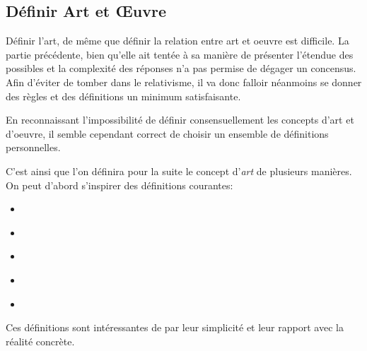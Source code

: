 \documentclass[12pt]{article} %
\begin{document}
\subsection{Définir Art et Œuvre}
Définir l'art, de même que définir la relation entre art et oeuvre est difficile. La partie précédente, bien qu'elle ait tentée à sa manière de présenter l'étendue des possibles et la complexité des réponses n'a pas permise de dégager un concensus. Afin d'éviter de tomber dans le relativisme, il va donc falloir néanmoins se donner des règles et des définitions un minimum satisfaisante. 

En reconnaissant l'impossibilité de définir consensuellement les concepts d'art et d'oeuvre, il semble cependant correct de choisir un ensemble de définitions personnelles.

C'est ainsi que l'on définira pour la suite le concept d'\textit{art} de plusieurs manières. On peut d'abord s'inspirer des définitions courantes:
\begin{itemize}
    \item {} \cite{WiktionnaireFr-art}
    \item {} \cite{WiktionnaireFr-art}
    \item {} \cite{LarousseOnline-art}
    \item {} \cite{LarousseOnline-art}
    \item {} \cite{LarousseOnline-art}
\end{itemize}
Ces définitions sont intéressantes de par leur simplicité et leur rapport avec la réalité concrète. 
\end{document}
